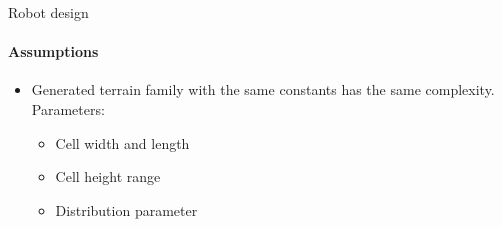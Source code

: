 \documentclass[aspectratio=169]{beamer}
\begin{document}
\begin{frame}[t]{Robot design}
    \framesubtitle{Assumptions}
    \large
    \begin{itemize}
        \item Generated terrain family with the same constants has the same complexity. 
        \\ 
        Parameters:
              \begin{itemize}
                \large
                  \item Cell width and length
                  \item Cell height range
                  \item Distribution parameter
              \end{itemize}
    \end{itemize}
\end{frame}
\end{document}
